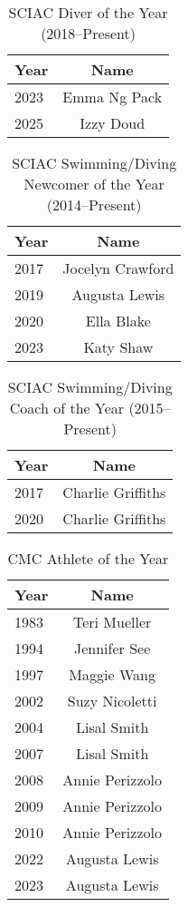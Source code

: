 \begin{table}[htbp]
\centering
\caption*{SCIAC Diver of the Year (2018–Present)}
\begin{tabular}{lc}
\toprule
Year & Name \\
\midrule
2023 & Emma Ng Pack \\
2025 & Izzy Doud \\
\bottomrule
\end{tabular}
\end{table}

\begin{table}[htbp]
\centering
\caption*{SCIAC Swimming/Diving Newcomer of the Year (2014–Present)}
\begin{tabular}{lc}
\toprule
Year & Name \\
\midrule
2017 & Jocelyn Crawford \\
2019 & Augusta Lewis \\
2020 & Ella Blake \\
2023 & Katy Shaw \\
\bottomrule
\end{tabular}
\end{table}

\begin{table}[htbp]
\centering
\caption*{SCIAC Swimming/Diving Coach of the Year (2015–Present)}
\begin{tabular}{lc}
\toprule
Year & Name \\
\midrule
2017 & Charlie Griffiths \\
2020 & Charlie Griffiths \\
\bottomrule
\end{tabular}
\end{table}

\begin{table}[htbp]
\centering
\caption*{CMC Athlete of the Year}
\begin{tabular}{lc}
\toprule
Year & Name \\
\midrule
1983 & Teri Mueller \\
1994 & Jennifer See \\
1997 & Maggie Wang \\
2002 & Suzy Nicoletti \\
2004 & Lisal Smith \\
2007 & Lisal Smith \\
2008 & Annie Perizzolo \\
2009 & Annie Perizzolo \\
2010 & Annie Perizzolo \\
2022 & Augusta Lewis \\
2023 & Augusta Lewis \\
\bottomrule
\end{tabular}
\end{table}

